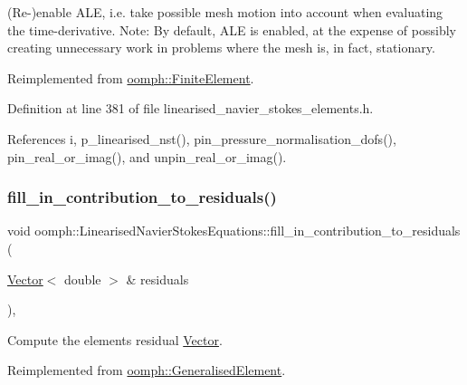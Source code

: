 (Re-\/)enable A\+LE, i.\+e. take possible mesh motion into account when evaluating the time-\/derivative. Note\+: By default, A\+LE is enabled, at the expense of possibly creating unnecessary work in problems where the mesh is, in fact, stationary. 



Reimplemented from \hyperlink{classoomph_1_1FiniteElement_a92ef8967fa4e2d6c33c51ea3efa3aa82}{oomph\+::\+Finite\+Element}.



Definition at line 381 of file linearised\+\_\+navier\+\_\+stokes\+\_\+elements.\+h.



References i, p\+\_\+linearised\+\_\+nst(), pin\+\_\+pressure\+\_\+normalisation\+\_\+dofs(), pin\+\_\+real\+\_\+or\+\_\+imag(), and unpin\+\_\+real\+\_\+or\+\_\+imag().

\mbox{\label{classoomph_1_1LinearisedNavierStokesEquations_a261b7d496e778aba3d43393bc955a36a}} 
\subsubsection{\texorpdfstring{fill\+\_\+in\+\_\+contribution\+\_\+to\+\_\+residuals()}{fill\_in\_contribution\_to\_residuals()}}
{\footnotesize\ttfamily void oomph\+::\+Linearised\+Navier\+Stokes\+Equations\+::fill\+\_\+in\+\_\+contribution\+\_\+to\+\_\+residuals (\begin{DoxyParamCaption}\item[{\hyperlink{classoomph_1_1Vector}{Vector}$<$ double $>$ \&}]{residuals }\end{DoxyParamCaption})\hspace{0.3cm}{\ttfamily [inline]}, {\ttfamily [virtual]}}



Compute the element\textquotesingle{}s residual \hyperlink{classoomph_1_1Vector}{Vector}. 



Reimplemented from \hyperlink{classoomph_1_1GeneralisedElement_a310c97f515e8504a48179c0e72c550d7}{oomph\+::\+Generalised\+Element}.



